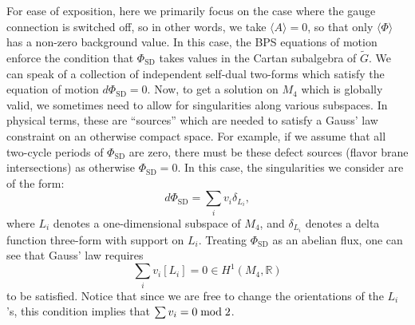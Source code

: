 \documentclass[12pt]{article}%
\numberwithin{equation}{section}
\renewcommand{\(}{\left(}
\renewcommand{\)}{\right)}
\renewcommand{\[}{\left[}
\renewcommand{\]}{\right]}
\begin{document}
For ease of exposition, here we primarily focus on the case where the gauge connection is switched off, so in other words, we take
$\langle A \rangle = 0$, so that only $\langle \Phi \rangle$ has a non-zero background value. In this case, the BPS equations of motion enforce the condition that $\Phi_{\mathrm{SD}}$ takes values in the Cartan subalgebra of $\widetilde{G}$. We can speak of a collection of independent self-dual two-forms which satisfy the equation of motion $d \Phi_{\mathrm{SD}} = 0$. Now, to get a solution on $M_4$ which is globally valid, we sometimes need to allow for singularities along various subspaces. In physical terms, these are ``sources'' which are needed to satisfy a Gauss' law constraint on an otherwise compact space. For example, if we assume that all two-cycle periods of $\Phi_{\mathrm{SD}}$ are zero, there must be these defect sources (flavor brane intersections) as otherwise $\Phi_{\mathrm{SD}}=0$. In this case, the singularities we consider are of the form:
\begin{equation}
d\Phi_{\mathrm{SD}}=\sum_i v_i \delta_{L_i},
\end{equation}
where $L_{i}$ denotes a one-dimensional subspace of $M_4$, and $\delta_{L_i}$ denotes a delta function three-form
with support on $L_{i}$. Treating $\Phi_{\mathrm{SD}}$ as an abelian flux, one can see that Gauss' law requires
\begin{equation}
\sum_i v_i [L_i]=0\in H^1(M_4,\mathbb{R})
\end{equation}
to be satisfied. Notice that since we are free to change the orientations of the $L_i$'s, this condition implies that $\sum v_i=0 \; \textnormal{mod} \; 2$.
\end{document}
